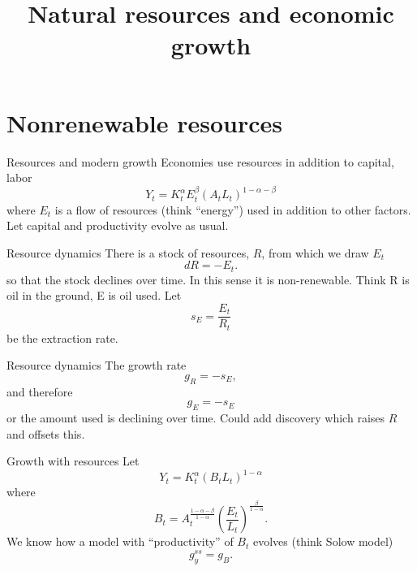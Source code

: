 

\title[Natural Resources]{Natural resources and economic growth}



\maketitle

\section{Nonrenewable resources}
\begin{frame}{Resources and modern growth}
Economies use resources in addition to capital, labor
\begin{equation}
	Y_t = K_t^{\alpha} E_t^{\beta} (A_tL_t)^{1-\alpha-\beta} \label{EQ_Y_E}
\end{equation}
where $E_t$ is a flow of resources (think ``energy'') used in addition to other factors. 
\vspace{.25in}\noindent
Let capital and productivity evolve as usual.
\end{frame}

\begin{frame}{Resource dynamics}
There is a stock of resources, $R$, from which we draw $E_t$
\begin{equation}
	dR = - E_t. \label{EQ_dotR}
\end{equation}
so that the stock declines over time. In this sense it is non-renewable. Think R is oil in the ground, E is oil used. Let
\begin{equation}
	s_E = \frac{E_t}{R_t}
\end{equation}
be the extraction rate.
\end{frame}

\begin{frame}{Resource dynamics}
The growth rate
\begin{equation}
	g_R = - s_E, \nonumber
\end{equation}
and therefore
\begin{equation}
	g_E = - s_E \nonumber
\end{equation}
or the amount used is declining over time. Could add discovery which raises $R$ and offsets this.
\end{frame}

\begin{frame}{Growth with resources}
Let 
\begin{equation}
	Y_t = K_t^{\alpha} (B_t L_t)^{1-\alpha} \label{EQ_Y_B}
\end{equation}
where 
\begin{equation}
	B_t = A_t^{\frac{1-\alpha-\beta}{1-\alpha}} \left(\frac{E_t}{L_t}\right)^{\frac{\beta}{1-\alpha}}. \label{EQ_B}
\end{equation}
We know how a model with ``productivity'' of $B_t$ evolves (think Solow model)
\begin{equation}
	g_y^{ss} = g_B. \nonumber
\end{equation}
\end{frame}

